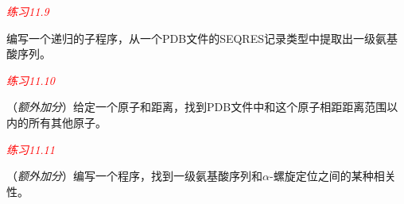 \textcolor{red}{\textit{练习11.9}}
\begin{adjustwidth}{4em}{}
编写一个递归的子程序，从一个PDB文件的SEQRES记录类型中提取出一级氨基酸序列。
\end{adjustwidth}

\textcolor{red}{\textit{练习11.10}}
\begin{adjustwidth}{4em}{}
（\textit{额外加分}）给定一个原子和距离，找到PDB文件中和这个原子相距距离范围以内的所有其他原子。
\end{adjustwidth}

\textcolor{red}{\textit{练习11.11}}
\begin{adjustwidth}{4em}{}
（\textit{额外加分}）编写一个程序，找到一级氨基酸序列和$\alpha$-螺旋定位之间的某种相关性。
\end{adjustwidth}


